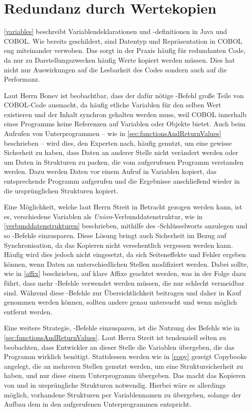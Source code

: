 \section{Redundanz durch Wertekopien}
\autoref{variables} beschreibt Variablendeklarationen und -definitionen in Java und COBOL. Wie bereits geschildert, sind Datentyp und Repräsentation in COBOL eng miteinander verwoben. Das sorgt in der Praxis häufig für redundanten Code, da nur zu Darstellungszwecken häufig Werte kopiert werden müssen. Dies hat nicht nur Auswirkungen auf die Lesbarkeit des Codes sondern auch auf die Performanz.

Laut Herrn Bonev ist beobachtbar, dass der dafür nötige -Befehl große Teile von COBOL-Code ausmacht, da häufig etliche Variablen für den selben Wert existieren und der Inhalt synchron gehalten werden muss, weil COBOL innerhalb eines Programms keine Referenzen auf Variablen oder Objekte bietet. Auch beim Aufrufen von Unterprogrammen -- wie in \autoref{sec:functionsAndReturnValues} beschrieben -- wird dies, den Experten nach, häufig genutzt, um eine gewisse Sicherheit zu haben, dass Daten an anderer Stelle nicht verändert werden oder um Daten in Strukturen zu packen, die vom aufgerufenen Programm verstanden werden. Dazu werden Daten vor einem Aufruf in Variablen kopiert, das entsprechende Programm aufgerufen und die Ergebnisse anschließend wieder in die ursprünglichen Strukturen kopiert.

Eine Möglichkeit, welche laut Herrn Streit in Betracht gezogen werden kann, ist es, verschiedene Variablen als \textit{Union}-Verbunddatenstruktur, wie in \autoref{verbunddatenstrukturen} beschrieben, mithilfe des -Schlüsselworts anzulegen und so -Befehle einzusparen. Diese Lösung bringt auch Sicherheit im Bezug auf Synchronisation, da das Kopieren nicht versehentlich vergessen werden kann. Häufig wird dies jedoch nicht eingesetzt, da sich Seiteneffekte und Fehler ergeben können, wenn Daten an unterschiedlichen Stellen modifiziert werden. Dabei sollte, wie in \autoref{affix} beschrieben, auf klare Affixe geachtet werden, was in der Folge dazu führt, dass mehr -Befehle verwendet werden müssen, die nur schlecht vermeidbar sind. Während diese -Befehle zur Übersichtlichkeit beitragen und daher in Kauf genommen werden können, sollten andere genau untersucht und wenn möglich entfernt werden.

Eine weitere Strategie, -Befehle einzusparen, ist die Nutzung des  Befehls wie in \autoref{sec:functionsAndReturnValues}. Laut Herrn Streit ist tendenziell selten zu beobachten, dass Entwickler an dieser Stelle die Variablen übergeben, die das Programm wirklich benötigt. Stattdessen werden wie in \autoref{copy} gezeigt Copybooks angelegt, die an mehreren Stellen genutzt werden, um eine Struktursicherheit zu haben, und nur diese einem Unterprogramm übergeben. Das macht das Kopieren von und in ursprüngliche Strukturen notwendig. Hierbei wäre es allerdings möglich, vorhandene Strukturen per Variablennamen zu übergeben, solange der Aufbau dem in den aufgerufenen Unterprogrammen entspricht.

